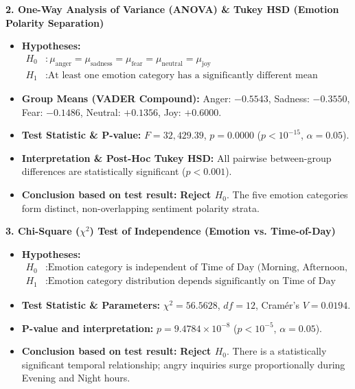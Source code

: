 \documentclass[12pt]{article}
\begin{document}
\noindent \textbf{2. One-Way Analysis of Variance (ANOVA) \& Tukey HSD (Emotion Polarity Separation)}
\begin{itemize}[leftmargin=1.5em]
    \item \textbf{Hypotheses:}
    \begin{align*}
        H_0 &: \mu_{\text{anger}} = \mu_{\text{sadness}} = \mu_{\text{fear}} = \mu_{\text{neutral}} = \mu_{\text{joy}} \\
        H_1 &: \text{At least one emotion category has a significantly different mean polarity.}
    \end{align*}
    \item \textbf{Group Means (VADER Compound):} Anger: $-0.5543$, Sadness: $-0.3550$, Fear: $-0.1486$, Neutral: $+0.1356$, Joy: $+0.6000$.
    \item \textbf{Test Statistic \& P-value:} $F = 32,429.39$, $p = 0.0000$ ($p < 10^{-15}$, $\alpha = 0.05$).
    \item \textbf{Interpretation \& Post-Hoc Tukey HSD:} All pairwise between-group differences are statistically significant ($p < 0.001$).
    \item \textbf{Conclusion based on test result:} \textbf{Reject $H_0$}. The five emotion categories form distinct, non-overlapping sentiment polarity strata.
\end{itemize}

\vspace{0.6em}

\noindent \textbf{3. Chi-Square ($\chi^2$) Test of Independence (Emotion vs. Time-of-Day)}
\begin{itemize}[leftmargin=1.5em]
    \item \textbf{Hypotheses:}
    \begin{align*}
        H_0 &: \text{Emotion category is independent of Time of Day (Morning, Afternoon, Evening, Night)} \\
        H_1 &: \text{Emotion category distribution depends significantly on Time of Day}
    \end{align*}
    \item \textbf{Test Statistic \& Parameters:} $\chi^2 = 56.5628$, $df = 12$, Cram\'{e}r's $V = 0.0194$.
    \item \textbf{P-value and interpretation:} $p = 9.4784 \times 10^{-8}$ ($p < 10^{-5}$, $\alpha = 0.05$).
    \item \textbf{Conclusion based on test result:} \textbf{Reject $H_0$}. There is a statistically significant temporal relationship; angry inquiries surge proportionally during Evening and Night hours.
\end{itemize}
\end{document}
